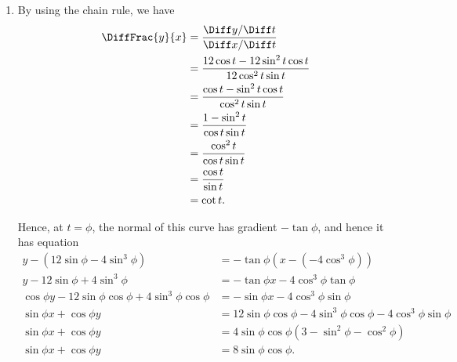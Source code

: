 \Question{\currfilebase}

\begin{enumerate}
    \item By using the chain rule, we have
          \begin{align*}
              \DiffFrac{y}{x} & = \frac{\Diff y / \Diff t}{\Diff x / \Diff t}               \\
                              & = \frac{12 \cos t - 12 \sin^2 t \cos t}{12 \cos^2 t \sin t} \\
                              & = \frac{\cos t - \sin^2 t \cos t}{\cos^2 t \sin t}          \\
                              & = \frac{1 - \sin^2 t}{\cos t \sin t}                        \\
                              & = \frac{\cos^2 t}{\cos t \sin t}                            \\
                              & = \frac{\cos t}{\sin t}                                     \\
                              & = \cot t.
          \end{align*}

          Hence, at \(t = \phi\), the normal of this curve has gradient \(- \tan \phi\), and hence it has equation
          \begin{align*}
              y - \left(12 \sin \phi - 4 \sin^3 \phi\right)                  & = - \tan \phi \left(x - \left(-4 \cos^3 \phi\right)\right)                   \\
              y - 12 \sin \phi + 4 \sin^3 \phi                               & =  - \tan \phi x - 4 \cos^3 \phi \tan \phi                                   \\
              \cos \phi y - 12 \sin \phi \cos \phi + 4 \sin^3 \phi \cos \phi & = - \sin \phi x - 4 \cos^3 \phi \sin \phi                                    \\
              \sin \phi x + \cos \phi y                                      & = 12 \sin \phi \cos \phi - 4 \sin^3 \phi \cos \phi - 4 \cos^3 \phi \sin \phi \\
              \sin \phi x + \cos \phi y                                      & = 4 \sin \phi \cos \phi \left(3 - \sin^2 \phi - \cos^2 \phi\right)           \\
              \sin \phi x + \cos \phi y                                      & = 8 \sin \phi \cos \phi.
          \end{align*}


\end{enumerate}
